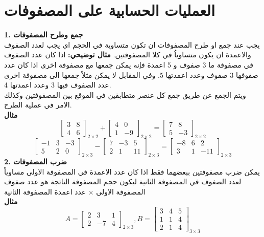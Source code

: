 \section{العمليات الحسابية على المصفوفات}
\textbf{1. جمع وطرح المصفوفات}\\
يجب عند جمع او طرح المصفوفات ان تكون متساوية في الحجم اي يجب لعدد الصفوف والاعمدة ان يكون متساوياُ في كلا المصفوفتين.
\newpage
\noindent
\textbf{مثال توضيحي:} اذا كان عدد الصفوف في مصفوفة ما 3 صفوف و 5 اعمدة فإنه يمكن جمعها مع مصفوفة اخرى اذا كان عدد صفوفها 3 صفوف وعدد اعمدتها 5. وفي المقابل لا يمكن مثلاً جمعها الى مصفوفة اخرى عدد الصفوف فيها 3 وعدد اعمدتها 4.\\
ويتم الجمع عن طريق جمع كل عنصر متطابقين في الموقع بين المصفوفتين وكذلك الامر في عملية الطرح.\\ [10pt]
\noindent
\textbf{مثال}
\[
\begin{bmatrix}
	3 & 8\\
	4 & 6
\end{bmatrix}_{2\times2}
+
\begin{bmatrix}
	4 & 0\\
	1 & -9
\end{bmatrix}_{2\times2}
=
\begin{bmatrix}
	7 & 8\\
	5 & -3
\end{bmatrix}_{2\times2}
\]
\vspace{10pt}
\[
\begin{bmatrix}
	-1 & 3 & -3\\
	5  & 2 & 0
\end{bmatrix}_{2\times3}
-
\begin{bmatrix}
	7 & -3 & 5\\
	2  & 1 &11
\end{bmatrix}_{2\times3}
=
\begin{bmatrix}
	-8 & 6 & 2\\
	3  & 1 & -11
\end{bmatrix}_{2\times3}
\]
\textbf{2. ضرب المصفوفات}\\
يمكن ضرب مصفوفتين ببعضهما فقط اذا كان عدد الاعمدة في المصفوفة الاولى مساوياً لعدد الصغوف في المصفوفة الثانية ليكون حجم المصفوفة الناتجة هو عدد صفوف المصفوفة الاولى × عدد اعمدة المصفوفة الثانية\\
\noindent
\textbf{مثال}
\[
A = 
\begin{bmatrix}
	2 & 3 & 1\\
	2 & -7 &4
\end{bmatrix}_{2\times 3}
, B =
\begin{bmatrix}
	3 &4& 5\\
	1 &1 &4\\
	2 &1& 4 
\end{bmatrix}_{3\times 3}
\]
